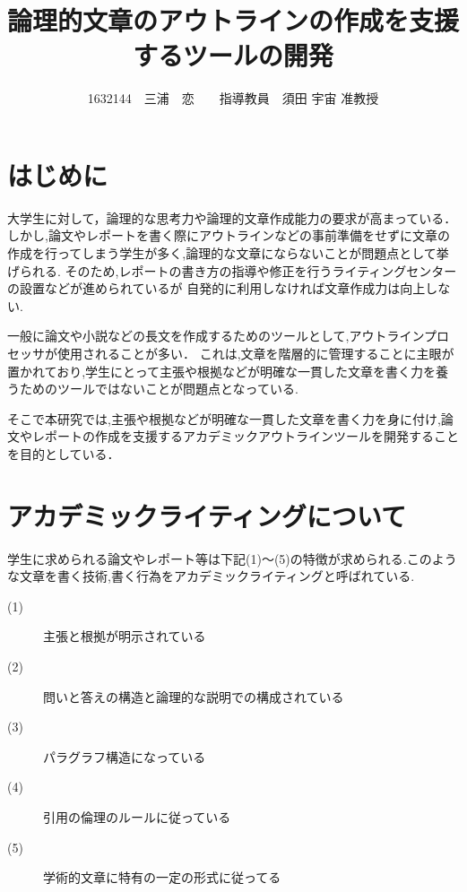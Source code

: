 \documentclass[twocolumn,10pt,a4j]{jsarticle}
\title{論理的文章のアウトラインの作成を支援するツールの開発}
\author{1632144　三浦　恋　　指導教員　須田 宇宙 准教授}
\date{}
\begin{document}
\maketitle

\section{はじめに}

大学生に対して，論理的な思考力や論理的文章作成能力の要求が高まっている．
しかし,論文やレポートを書く際にアウトラインなどの事前準備をせずに文章の作成を行ってしまう学生が多く,論理的な文章にならないことが問題点として挙げられる.
そのため,レポートの書き方の指導や修正を行うライティングセンターの設置などが進められているが
自発的に利用しなければ文章作成力は向上しない.

一般に論文や小説などの長文を作成するためのツールとして,アウトラインプロセッサが使用されることが多い．
これは,文章を階層的に管理することに主眼が置かれており,学生にとって主張や根拠などが明確な一貫した文章を書く力を養うためのツールではないことが問題点となっている.

そこで本研究では,主張や根拠などが明確な一貫した文章を書く力を身に付け,論文やレポートの作成を支援するアカデミックアウトラインツールを開発することを目的としている．

\section{アカデミックライティングについて}
\begin{comment}
一般に利用されているアウトラインプロセッサは全体の構造を組み立て,見出しをつけていき,文章を階層的に管理することのできるソフトウェアのことを指す.
しかし大学で学生に作成が求められる論文やレポート等には以下(1)~(5)の特徴が挙げられる.このような文章を書く技術,書く行為,または書いた物のことをアカデミックライティングと呼ぶ.
\end{comment}

学生に求められる論文やレポート等は下記(1)〜(5)の特徴が求められる.このような文章を書く技術,書く行為をアカデミックライティングと呼ばれている\cite{ren01}.


\begin{description}
  \item[(1)] 主張と根拠が明示されている
  \item[(2)] 問いと答えの構造と論理的な説明での構成されている
  \item[(3)] パラグラフ構造になっている
  \item[(4)] 引用の倫理のルールに従っている
  \item[(5)] 学術的文章に特有の一定の形式に従ってる
\end{description}
\end{document}

